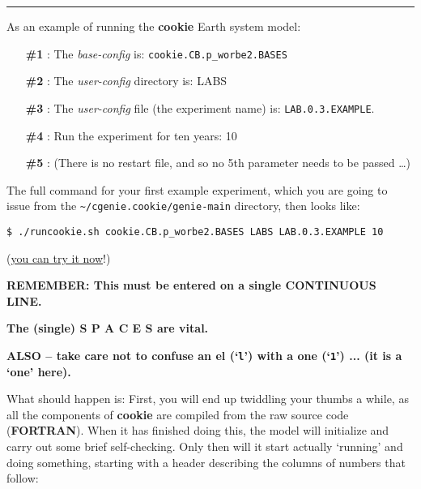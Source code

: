 \vspace{1mm}
\noindent\rule{4cm}{0.1mm}
\vspace{2mm}

\noindent As an example of running the \textbf{cookie} Earth system model:

\vspace{2mm}
\begin{enumerate}[noitemsep]
\setlength{\itemindent}{.2in}
\item[\textbf{\#1}]: The \textit{base-config} is: \texttt{cookie.CB.p\_worbe2.BASES}
\item[\textbf{\#2}]: The \textit{user-config} directory is: \textsf{\small LABS}
\item[\textbf{\#3}]: The \textit{user-config} file (the experiment name) is: \texttt{LAB.0.3.EXAMPLE}.
\item[\textbf{\#4}]: Run the experiment for ten years: 10
\item[\textbf{\#5}]: (There is no restart file, and so no 5th parameter needs to be passed …)
\end{enumerate}

The full command for your first example experiment, which you are going to issue from the \texttt{\~}\texttt{/cgenie.cookie/genie-main} directory, then looks like:

\vspace{-1mm}
\begin{verbatim}
$ ./runcookie.sh cookie.CB.p_worbe2.BASES LABS LAB.0.3.EXAMPLE 10
\end{verbatim}
\vspace{-1mm}

\noindent(\uline{you can try it now}!)

\vspace{2mm}
\textbf{REMEMBER: This must be entered on a single CONTINUOUS LINE.}

\textbf{The (single) S P A C E S are vital. }

\textbf{ALSO -- take care not to confuse an el (‘\texttt{l}’) with a one (‘\texttt{1}’)  ... (it is a ‘one’ here).}

\newpage

\noindent What should happen is: First, you will end up twiddling your thumbs a while, as all the components of \textbf{cookie} are compiled from the raw source code (\textbf{FORTRAN}). When it has finished doing this, the model will initialize and carry out some brief self-checking. Only then will it start actually ‘running’ and doing something, starting with a header describing the columns of numbers that follow:

